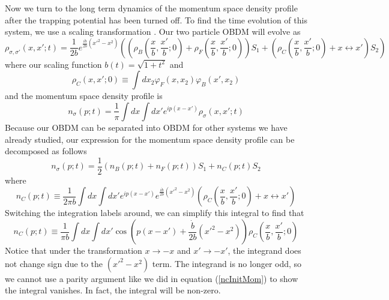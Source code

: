 \documentclass[onecolumn,english,aps,pra]{revtex4}
\begin{document}
Now we turn to the long term dynamics of the momentum space density profile after the trapping potential has been turned off. To find the time evolution of this system, we use a scaling transformation \cite{zel1998quantum}. Our two particle OBDM will evolve as
%
\begin{equation}
\rho_{\sigma, \sigma'}(x, x';t) = \frac{1}{2b} e^{\frac{i\dot{b}}{2b}(x'^2 - x^2)}\left(\left(\rho_B\left(\frac{x}{b},\frac{x'}{b};0\right) + \rho_F\left(\frac{x}{b},\frac{x'}{b};0\right)\right)
 S_1 + 
 \left( \rho_C\left(\frac{x}{b},\frac{x'}{b};0\right) + x \leftrightarrow x' \right)S_2\right)
 \label{TimeDepOBDM}
\end{equation}
where our scaling function $b(t) = \sqrt{1+t^2}$ and
\[
\rho_C(x,x';0) \equiv \int dx_2 \varphi_F(x,x_2)\varphi_B(x',x_2)
\]
%
and the momentum space density profile is
%
\begin{equation}
n_\sigma(p;t) = \frac{1}{\pi} \int dx \int dx' e^{ip(x-x')} \rho_{\sigma}(x,x';t)
\end{equation}
%
Because our OBDM can be separated into OBDM for other systems we have already studied, our expression for the momentum space density profile can be decomposed as follows
%
\begin{equation}
n_\sigma(p;t) = \frac{1}{2}\left(n_B(p;t) + n_F(p;t)\right)
 S_1 + n_C(p;t)S_2
 \label{MSDF-TimeDep}
\end{equation}
where
\begin{equation}
n_C(p;t) \equiv \frac{1}{2\pi b} \int dx \int dx' e^{ip(x-x')} e^{\frac{i\dot{b}}{2b}(x'^2 - x^2)} \left(\rho_C\left(\frac{x}{b},\frac{x'}{b};0\right) + x \leftrightarrow x'\right)
\end{equation}
Switching the integration labels around, we can simplify this integral to find that 
\begin{equation}
n_C(p;t) \equiv \frac{1}{\pi b} \int dx \int dx' \cos(p(x-x') + \frac{\dot{b}}{2b}(x'^2 - x^2))
\rho_C\left(\frac{x}{b},\frac{x'}{b};0\right)
\end{equation}
Notice that under the transformation $x\rightarrow -x$ and $x' \rightarrow -x'$, the integrand does not change sign due to the $(x'^2 -x^2)$ term. The integrand is no longer odd, so we cannot use a parity argument like we did in equation (\ref{ncInitMom}) to show the integral vanishes. In fact, the integral will be non-zero. 
\end{document}
